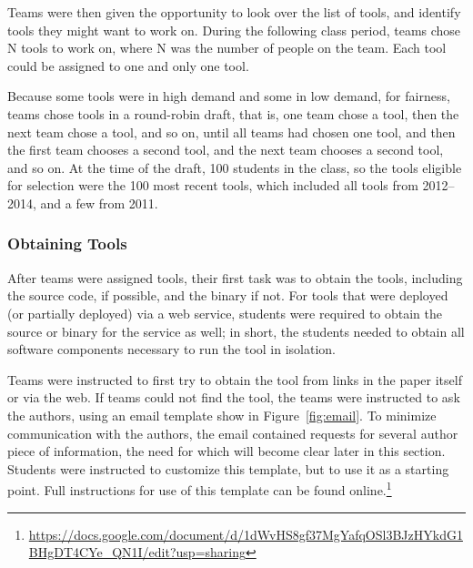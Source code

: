 \documentclass{sig-alternate-05-2015}
\begin{document}
Teams were then given the opportunity to look over the list of
tools, and identify tools they might want to work on.
During the following class period, teams chose N tools to work on,
where N was the number of people on the team.
Each tool could be assigned to one and only one tool.

Because some tools were in high demand and some in low demand, for fairness,
teams chose tools in a round-robin draft,
that is, one team chose a tool, then the next team chose a tool, and so on,
until all teams had chosen one tool, and then the first team chooses a second
tool, and the next team chooses a second tool, and so on.
At the time of the draft, 100 students in the class, so the tools eligible
for selection were the 100 most recent tools, which included all tools
from 2012--2014, and a few from 2011.

\subsubsection{Obtaining Tools}

After teams were assigned tools, their first task was to 
obtain the tools, including the source code, if possible,
and the binary if not.
For tools that were deployed (or partially deployed) via a web service, 
students were required to obtain the source or binary for
the service as well; in short, the students needed to
obtain all software components necessary to run the tool
in isolation. 

Teams were instructed to first try to 
obtain the tool from links in the paper itself or via
the web.
If teams could not find the tool, the teams
were instructed to ask the authors, using an email
template show in Figure~\ref{fig:email}.
To minimize communication with the authors, 
the email contained requests for several author
piece of information, the need for which will become 
clear later in this section.
Students were instructed to customize this template,
but to use it as a starting point. 
Full instructions for use of this template can be found 
online.\footnote{\url{https://docs.google.com/document/d/1dWvHS8gf37MgYafqOSl3BJzHYkdG1BHgDT4CYe_QN1I/edit?usp=sharing}}
\end{document}
